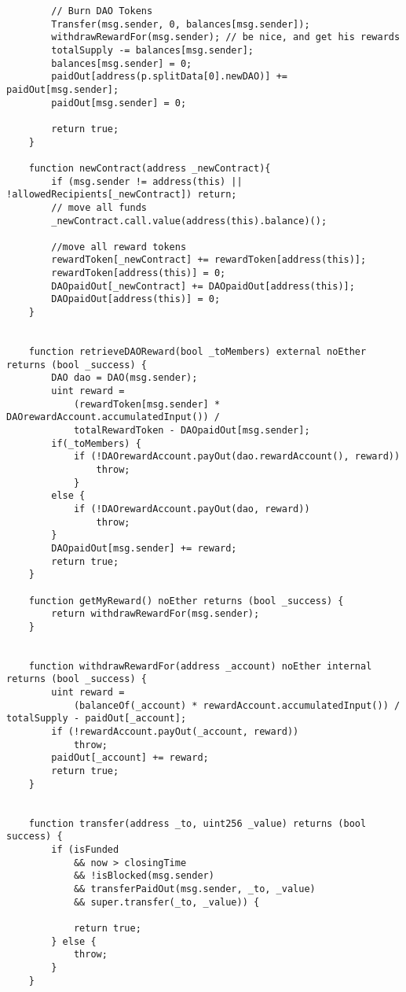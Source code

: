 \documentclass[9pt,oneside]{amsart}
\begin{document}
\begin{appendix}
\begin{verbatim}
        // Burn DAO Tokens
        Transfer(msg.sender, 0, balances[msg.sender]);
        withdrawRewardFor(msg.sender); // be nice, and get his rewards
        totalSupply -= balances[msg.sender];
        balances[msg.sender] = 0;
        paidOut[address(p.splitData[0].newDAO)] += paidOut[msg.sender];
        paidOut[msg.sender] = 0;

        return true;
    }

    function newContract(address _newContract){
        if (msg.sender != address(this) || !allowedRecipients[_newContract]) return;
        // move all funds
        _newContract.call.value(address(this).balance)();

        //move all reward tokens
        rewardToken[_newContract] += rewardToken[address(this)];
        rewardToken[address(this)] = 0;
        DAOpaidOut[_newContract] += DAOpaidOut[address(this)];
        DAOpaidOut[address(this)] = 0;
    }


    function retrieveDAOReward(bool _toMembers) external noEther returns (bool _success) {
        DAO dao = DAO(msg.sender);
        uint reward =
            (rewardToken[msg.sender] * DAOrewardAccount.accumulatedInput()) /
            totalRewardToken - DAOpaidOut[msg.sender];
        if(_toMembers) {
            if (!DAOrewardAccount.payOut(dao.rewardAccount(), reward))
                throw;
            }
        else {
            if (!DAOrewardAccount.payOut(dao, reward))
                throw;
        }
        DAOpaidOut[msg.sender] += reward;
        return true;
    }

    function getMyReward() noEther returns (bool _success) {
        return withdrawRewardFor(msg.sender);
    }


    function withdrawRewardFor(address _account) noEther internal returns (bool _success) {
        uint reward =
            (balanceOf(_account) * rewardAccount.accumulatedInput()) / totalSupply - paidOut[_account];
        if (!rewardAccount.payOut(_account, reward))
            throw;
        paidOut[_account] += reward;
        return true;
    }


    function transfer(address _to, uint256 _value) returns (bool success) {
        if (isFunded
            && now > closingTime
            && !isBlocked(msg.sender)
            && transferPaidOut(msg.sender, _to, _value)
            && super.transfer(_to, _value)) {

            return true;
        } else {
            throw;
        }
    }



\end{verbatim}
\end{appendix}
\end{document}
